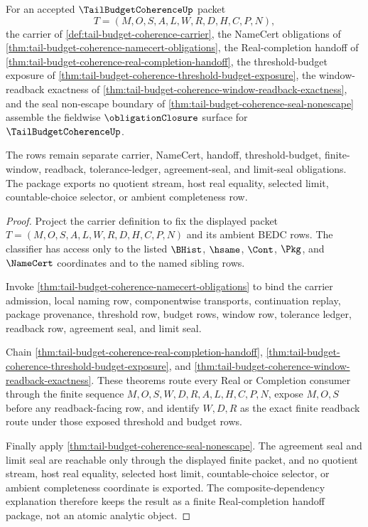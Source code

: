 \begin{theorem}
\label{thm:tail-budget-coherence-obligation-closure-package}
For an accepted $\TailBudgetCoherenceUp$ packet
$$
T=(M,O,S,A,L,W,R,D,H,C,P,N),
$$
the carrier of \autoref{def:tail-budget-coherence-carrier}, the NameCert obligations of \autoref{thm:tail-budget-coherence-namecert-obligations}, the Real-completion handoff of \autoref{thm:tail-budget-coherence-real-completion-handoff}, the threshold-budget exposure of \autoref{thm:tail-budget-coherence-threshold-budget-exposure}, the window-readback exactness of \autoref{thm:tail-budget-coherence-window-readback-exactness}, and the seal non-escape boundary of \autoref{thm:tail-budget-coherence-seal-nonescape} assemble the fieldwise $\obligationClosure$ surface for $\TailBudgetCoherenceUp$.

The rows remain separate carrier, NameCert, handoff, threshold-budget, finite-window, readback, tolerance-ledger, agreement-seal, and limit-seal obligations. The package exports no quotient stream, host real equality, selected limit, countable-choice selector, or ambient completeness row.
\end{theorem}
\begin{proof}
Project the carrier definition to fix the displayed packet $T=(M,O,S,A,L,W,R,D,H,C,P,N)$ and its ambient BEDC rows. The classifier has access only to the listed $\BHist$, $\hsame$, $\Cont$, $\Pkg$, and $\NameCert$ coordinates and to the named sibling rows.

Invoke \autoref{thm:tail-budget-coherence-namecert-obligations} to bind the carrier admission, local naming row, componentwise transports, continuation replay, package provenance, threshold row, budget rows, window row, tolerance ledger, readback row, agreement seal, and limit seal.

Chain \autoref{thm:tail-budget-coherence-real-completion-handoff}, \autoref{thm:tail-budget-coherence-threshold-budget-exposure}, and \autoref{thm:tail-budget-coherence-window-readback-exactness}. These theorems route every Real or Completion consumer through the finite sequence $M,O,S,W,D,R,A,L,H,C,P,N$, expose $M,O,S$ before any readback-facing row, and identify $W,D,R$ as the exact finite readback route under those exposed threshold and budget rows.

Finally apply \autoref{thm:tail-budget-coherence-seal-nonescape}. The agreement seal and limit seal are reachable only through the displayed finite packet, and no quotient stream, host real equality, selected host limit, countable-choice selector, or ambient completeness coordinate is exported. The composite-dependency explanation therefore keeps the result as a finite Real-completion handoff package, not an atomic analytic object.
\end{proof}

